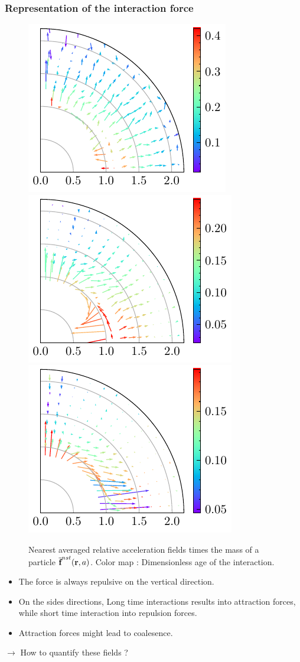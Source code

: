 \documentclass{sintefbeamer}
\begin{document}
\begin{frame}
  \frametitle{Representation of the interaction force}

  \begin{figure}
    \includegraphics[height=0.25\textwidth]{image/HOMOGENEOUS/fDrop/F_mu_r_0_1_Ga_10_PHI_0_05.pdf}
    \includegraphics[height=0.25\textwidth]{image/HOMOGENEOUS/fDrop/F_mu_r_0_1_Ga_25_PHI_0_05.pdf}
    \includegraphics[height=0.25\textwidth]{image/HOMOGENEOUS/fDrop/F_mu_r_0_1_Ga_75_PHI_0_05.pdf}
    
    \caption{Nearest averaged relative acceleration fields times the mass of a particle $\overline{\textbf{f}}^{nst}(\textbf{r},a)$. 
    Color map : Dimensionless age of the interaction.}
  \end{figure}

  
\begin{itemize}
  \item The force is always repulsive on the vertical direction.  
  \item On the sides  directions, Long time interactions results into attraction forces, while short time interaction into repulsion forces.
  \item Attraction forces might lead to coalesence. 
\end{itemize}

$\rightarrow$ How to quantify these fields ? 
\end{frame}
\end{document}
